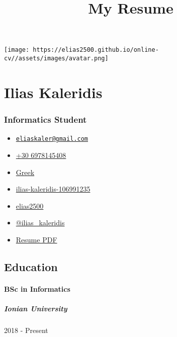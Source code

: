 \documentclass[english,]{article}
\title{My Resume}
\date{}
\providecommand{\tightlist}{%
  \setlength{\itemsep}{0pt}\setlength{\parskip}{0pt}}
\let\oldparagraph\paragraph
\renewcommand{\paragraph}[1]{\oldparagraph{#1}\mbox{}}
\let\oldsubparagraph\subparagraph
\renewcommand{\subparagraph}[1]{\oldsubparagraph{#1}\mbox{}}
\begin{document}
\maketitle

\texttt{[image: https://elias2500.github.io/online-cv//assets/images/avatar.png]}

\hypertarget{ilias-kaleridis}{%
\section{Ilias Kaleridis}\label{ilias-kaleridis}}

\hypertarget{informatics-student}{%
\subsubsection{Informatics Student}\label{informatics-student}}

\begin{itemize}
\tightlist
\item
  \emph{}
  \href{mailto:eliaskaler@gmail.com}{\nolinkurl{eliaskaler@gmail.com}}
\item
  \emph{} \href{tel:+30\%206978145408}{+30 6978145408}
\item
  \emph{} \href{}{Greek}
\item
  \emph{}
  \href{https://linkedin.com/in/ilias-kaleridis-106991235}{ilias-kaleridis-106991235}
\item
  \emph{} \href{http://github.com/elias2500}{elias2500}
\item
  \emph{} \href{https://twitter.com/@ilias_kaleridis}{@ilias\_kaleridis}
\item
  \emph{}
  \href{https://elias2500.github.io/online-cv/pdf/index.pdf}{Resume PDF}
\end{itemize}

\hypertarget{education}{%
\subsection{Education}\label{education}}

\hypertarget{bsc-in-informatics}{%
\paragraph{BSc in Informatics}\label{bsc-in-informatics}}

\hypertarget{ionian-university}{%
\subparagraph{Ionian University}\label{ionian-university}}

2018 - Present
\end{document}
